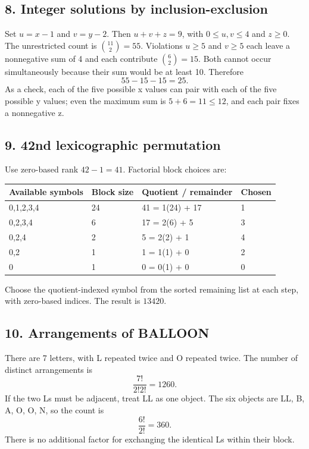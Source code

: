 \documentclass[11pt,a4paper]{article}
\begin{document}
\noindent\begin{minipage}{\linewidth}\subsection*{8. Integer solutions by inclusion-exclusion}

Set $u=x-1$ and $v=y-2$. Then $u+v+z=9$, with $0\le u,v\le4$ and $z\ge0$. The unrestricted count is $\binom{11}{2}=55$. Violations $u\ge5$ and $v\ge5$ each leave a nonnegative sum of 4 and each contribute $\binom62=15$. Both cannot occur simultaneously because their sum would be at least 10. Therefore
\[\boxed{55-15-15=25}.
\]
As a check, each of the five possible x values can pair with each of the five possible y values; even the maximum sum is $5+6=11\le12$, and each pair fixes a nonnegative z.
\end{minipage}\par\medskip
\noindent\begin{minipage}{\linewidth}\subsection*{9. 42nd lexicographic permutation}

Use zero-based rank $42-1=41$. Factorial block choices are:
\begin{center}\renewcommand{\arraystretch}{1.2}\begin{tabular}{llll}\hline Available symbols & Block size & Quotient / remainder & Chosen\\\hline
0,1,2,3,4 & 24 & 41 = 1(24) + 17 & 1\\
0,2,3,4 & 6 & 17 = 2(6) + 5 & 3\\
0,2,4 & 2 & 5 = 2(2) + 1 & 4\\
0,2 & 1 & 1 = 1(1) + 0 & 2\\
0 & 1 & 0 = 0(1) + 0 & 0\\\hline\end{tabular}\end{center}Choose the quotient-indexed symbol from the sorted remaining list at each step, with zero-based indices. The result is $\boxed{13420}$.
\end{minipage}\par\medskip
\noindent\begin{minipage}{\linewidth}\subsection*{10. Arrangements of BALLOON}

There are 7 letters, with L repeated twice and O repeated twice. The number of distinct arrangements is
\[\boxed{\frac{7!}{2!2!}=1260}.
\]
If the two Ls must be adjacent, treat LL as one object. The six objects are LL, B, A, O, O, N, so the count is
\[\boxed{\frac{6!}{2!}=360}.
\]
There is no additional factor for exchanging the identical Ls within their block.
\end{minipage}\par\medskip
\end{document}
